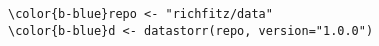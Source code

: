 \documentclass[class=minimal,border=0]{standalone}
\begin{document}
%
\begin{BVerbatim}[bgcolor=b-darkgrey]
\color{b-blue}repo <- "richfitz/data"
\color{b-blue}d <- datastorr(repo, version="1.0.0")
\end{BVerbatim}
\end{document}
